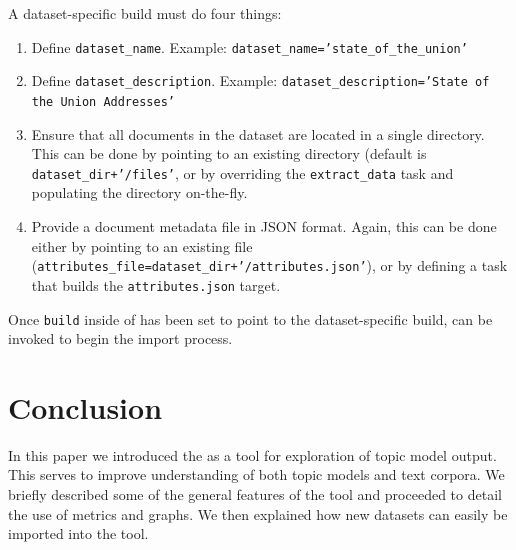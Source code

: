 \documentclass[11pt]{article}
\begin{document}
A dataset-specific build must do four things:
\begin{enumerate}
\item Define \texttt{dataset\_name}.
    \newline Example: \texttt{dataset\_name='state\_of\_the\_union'}
  \item Define \texttt{dataset\_description}.
    \newline Example: \texttt{dataset\_description='State of the Union Addresses'}
  \item Ensure that all documents in the dataset are located in a single directory.
    This can be done by pointing to an existing directory (default is \texttt{dataset\_dir+'/files'}, or by overriding the
    \texttt{extract\_data} task and populating the directory on-the-fly.
  \item Provide a document metadata file in JSON format. Again, this can be done
    either by pointing to an existing file (\texttt{attributes\_\allowbreak{}file=\allowbreak{}dataset\_\allowbreak{}dir\allowbreak{}+\allowbreak{}'/attributes\allowbreak{}.json'}), or by defining a task that builds the \texttt{attributes.json} target.
\end{enumerate}

Once \texttt{build} inside of \texttt{\buildscript} has been set to point to
the dataset-specific build, \texttt{\buildscript} can be invoked to begin the
import process.

\section{Conclusion}
In this paper we introduced the \tool{} as a tool for exploration of
topic model output. This serves to improve understanding of both topic models
and text corpora. We briefly described some of the general features of the tool
and proceeded to detail the use of metrics and graphs. We then explained how
new datasets can easily be imported into the tool.
\end{document}
